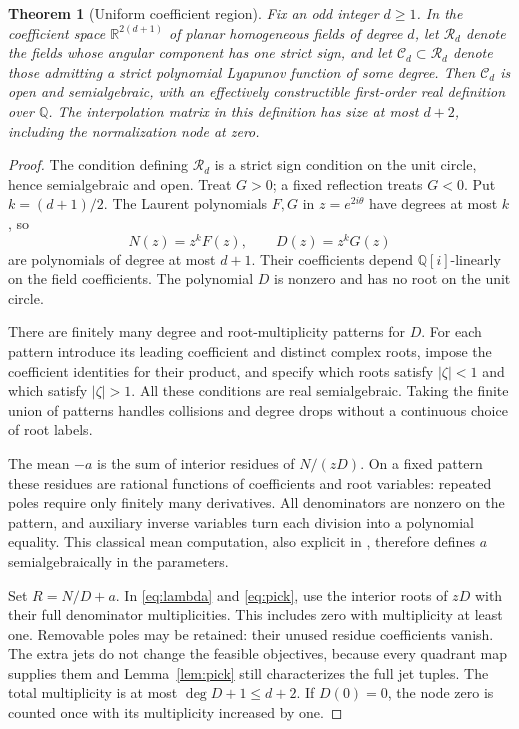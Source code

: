 \documentclass[11pt,a4paper]{article}
\newtheorem{theorem}{Theorem}[section]
\theoremstyle{remark}\newtheorem{remark}[theorem]{Remark}
\newcommand{\R}{\mathbb R}
\begin{document}
\begin{theorem}[Uniform coefficient region]\label{thm:region}
Fix an odd integer \(d\geq1\). In the coefficient space
\(\R^{2(d+1)}\) of planar homogeneous fields of degree \(d\), let
\(\mathcal R_d\) denote the fields whose angular component has one
strict sign, and let \(\mathcal C_d\subset\mathcal R_d\) denote those
admitting a strict polynomial Lyapunov function of some degree.
Then \(\mathcal C_d\) is open and semialgebraic, with an effectively
constructible first-order real definition over \(\mathbb Q\).
The interpolation matrix in this definition has size at most \(d+2\),
including the normalization node at zero.
\end{theorem}
\begin{proof}
The condition defining \(\mathcal R_d\) is a strict sign condition on
the unit circle, hence semialgebraic and open. Treat \(G>0\); a fixed
reflection treats \(G<0\). Put \(k=(d+1)/2\). The Laurent polynomials
\(F,G\) in \(z=e^{2i\theta}\) have degrees at most \(k\), so
\[
 N(z)=z^k F(z),\qquad D(z)=z^k G(z)
\]
are polynomials of degree at most \(d+1\). Their coefficients depend
\(\mathbb Q[i]\)-linearly on the field coefficients. The polynomial
\(D\) is nonzero and has no root on the unit circle.

There are finitely many degree and root-multiplicity patterns for \(D\).
For each pattern introduce its leading coefficient and distinct complex
roots, impose the coefficient identities for their product, and specify
which roots satisfy \(|\zeta|<1\) and which satisfy \(|\zeta|>1\).
All these conditions are real semialgebraic. Taking the finite union of
patterns handles collisions and degree drops without a continuous choice
of root labels.

The mean \(-a\) is the sum of interior residues of \(N/(zD)\).
On a fixed pattern these residues are rational functions of coefficients
and root variables: repeated poles require only finitely many derivatives.
All denominators are nonzero on the pattern, and auxiliary inverse
variables turn each division into a polynomial equality. This classical
mean computation, also explicit in \cite[Supplement, Theorem~20.3]{korda},
therefore defines \(a\) semialgebraically in the parameters.

Set \(R=N/D+a\). In \eqref{eq:lambda} and \eqref{eq:pick}, use the
interior roots of \(zD\) with their full denominator multiplicities.
This includes zero with multiplicity at least one. Removable poles may
be retained: their unused residue coefficients vanish. The extra jets
do not change the feasible objectives, because every quadrant map
supplies them and Lemma~\ref{lem:pick} still characterizes the full
jet tuples. The total multiplicity is at most
\(\deg D+1\leq d+2\). If \(D(0)=0\), the node zero is counted once
with its multiplicity increased by one.


\end{proof}
\end{document}

